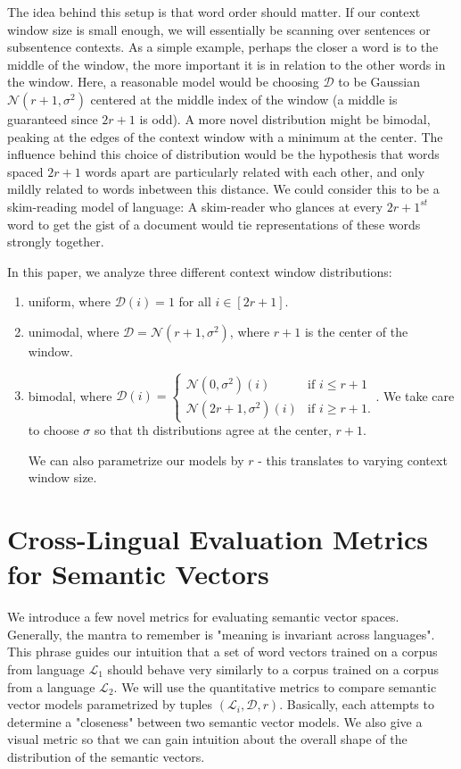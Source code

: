 \documentclass[12pt, usenames]{article}
\theoremstyle{definition}
\theoremstyle{definition}
\theoremstyle{definition}
\newcommand{\mc}[1]
{\mathcal{#1}}
\begin{document}
The idea behind this setup is that word order should matter. If our context window size is small enough, we will essentially be scanning over sentences or subsentence contexts. As a simple example, perhaps the closer a word is to the middle of the window, the more important it is in relation to the other words in the window. Here, a reasonable model would be choosing $\mc{D}$ to be Gaussian $\mc{N}(r + 1, \sigma^2)$ centered at the middle index of the window (a middle is guaranteed since $2r + 1$ is odd). A more novel distribution might be bimodal, peaking at the edges of the context window with a minimum at the center. The influence behind this choice of distribution would be the hypothesis that words spaced $2r + 1$ words apart are particularly related with each other, and only mildly related to words inbetween this distance. We could consider this to be a skim-reading model of language: A skim-reader who glances at every $2r + 1^{st}$ word to get the gist of a document would tie representations of these words strongly together. 

In this paper, we analyze three different context window distributions: 
\begin{enumerate}

\item uniform, where $\mc{D}(i) = 1$ for all $i \in [2r + 1]$.

\item unimodal, where $\mc{D} = \mc{N}(r + 1, \sigma^2)$, where $r + 1$ is the center of the window.

\item bimodal, where $\mc{D}(i) = \begin{cases} \mc{N}(0, \sigma^2)(i) &\mbox{if } i \leq r + 1  \\ 
\mc{N}(2r + 1, \sigma^2)(i) & \mbox{if } i \geq r + 1. \end{cases}$. We take care to choose $\sigma$ so that th distributions agree at the center, $r + 1$.

We can also parametrize our models by $r$ - this translates to varying context window size. 

\end{enumerate}


\section{Cross-Lingual Evaluation Metrics for Semantic Vectors}
\label{sec:Section3}
We introduce a few novel metrics for evaluating semantic vector spaces. Generally, the mantra to remember is "meaning is invariant across languages". This phrase guides our intuition that a set of word vectors trained on a corpus from language $\mc{L}_1$ should behave very similarly to a corpus trained on a corpus from a language $\mc{L}_2$. We will use the quantitative metrics to compare semantic vector models parametrized by tuples $(\mc{L}_i, \mc{D}, r)$. Basically, each attempts to determine a "closeness" between two semantic vector models. We also give a visual metric so that we can gain intuition about the overall shape of the distribution of the semantic vectors. 
\end{document}
